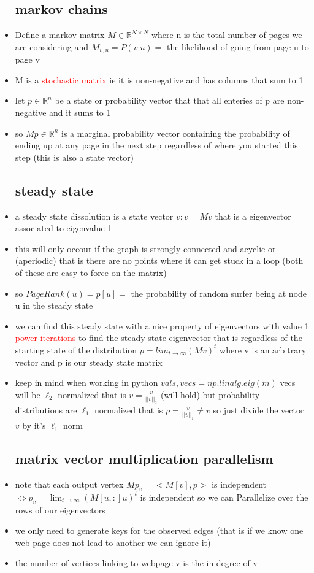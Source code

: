 \documentclass{article}
\begin{document}
\begin{itemize}
\subsection*{markov chains}
\item Define a markov matrix $M\in \mathbb{R}^{N\times N}$ where n is the total number of pages we are considering and $M_{v,u}=P(v|u)=$ the likelihood of going from page u to page v   
\item M is a \textcolor{red}{stochastic matrix} ie it is non-negative and has columns that sum to 1 
\item let $p\in \mathbb{R}^{n}$ be a state or probability vector that that  all enteries of p are non-negative and it sums to 1 
\item so $Mp\in \mathbb{R}^{n}$ is a marginal probability vector containing the probability of ending up at any page in the next step regardless of where you started this step (this is also a state vector)
\subsection*{steady state}
\item a steady state dissolution is a state vector $v: v=Mv$ that is a eigenvector associated to eigenvalue 1 
\item this will only occour if the graph is strongly connected and acyclic or  (aperiodic) that is there are no points where it can get stuck in a loop (both of these are easy to force on the matrix)
\item so $PageRank(u)=p[u]=$ the probability of random surfer being at node u in the steady state 
\item we can find this steady state with a nice property of eigenvectors with value 1 \textcolor{red}{ power iterations} to find the steady state eigenvector that is regardless of the starting state of the distribution $p=lim_{t\rightarrow \infty}(Mv)^{t}$ where v is an arbitrary vector and p is our steady state matrix
\item keep in mind when working in python $vals,vecs=np.linalg.eig(m)$ vecs will be $\ell_{2}$ normalized that is $v=\frac{v}{||v||_{2}}$ (will hold) but probability distributions are $\ell_{1}$ normalized that is $p=\frac{v}{||v||_{1}}\neq v$ so just divide the vector $v$ by it's $\ell_1$ norm
\subsection*{matrix vector multiplication parallelism}
\item note that each output vertex $Mp_{v}=<M[v],p>$ is independent $\iff p_{v}=\lim_{t\rightarrow \infty}(M[u,:]u)^{t}$ is independent so we can Parallelize over the rows of our eigenvectors
\item we only need to generate keys for the observed edges (that is if we know one web page does not lead to another we can ignore it)
\item the number of vertices linking to webpage v is the in degree of v

\end{itemize}
\end{document}
